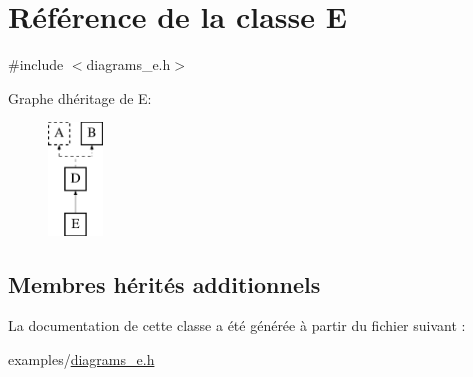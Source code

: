 \hypertarget{class_e}{}\section{Référence de la classe E}
\label{class_e}


{\ttfamily \#include $<$diagrams\+\_\+e.\+h$>$}

Graphe d\textquotesingle{}héritage de E\+:\begin{figure}[H]
\begin{center}
\leavevmode
\includegraphics[height=3.000000cm]{class_e}
\end{center}
\end{figure}
\subsection*{Membres hérités additionnels}


La documentation de cette classe a été générée à partir du fichier suivant \+:\begin{DoxyCompactItemize}
\item 
examples/\hyperlink{diagrams__e_8h}{diagrams\+\_\+e.\+h}\end{DoxyCompactItemize}
